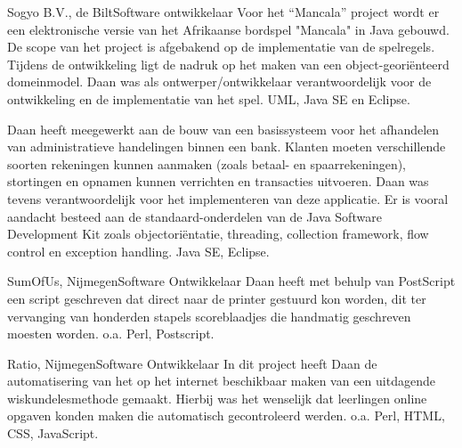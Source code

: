 \begin{workExperience}{Sogyo B.V., de Bilt}{Software ontwikkelaar}{}
		Voor het ``Mancala'' project wordt er een elektronische versie van het 
		Afrikaanse bordspel "Mancala" in Java gebouwd. De scope van het 
		project is afgebakend op de implementatie van de spelregels. Tijdens
		de ontwikkeling ligt de nadruk op het maken van een 
		object-geori\"enteerd domeinmodel. Daan was als ontwerper/ontwikkelaar
		verantwoordelijk voor de ontwikkeling en de implementatie van het 
		spel.
		\technics UML, Java SE en Eclipse.
		
		Daan heeft meegewerkt aan de bouw van een basissysteem voor het 
		afhandelen van administratieve handelingen binnen een bank. Klanten 
		moeten verschillende soorten rekeningen kunnen aanmaken (zoals betaal- 
		en spaarrekeningen), stortingen en opnamen kunnen verrichten en 
		transacties uitvoeren. Daan was tevens verantwoordelijk voor het 
		implementeren van deze applicatie. 
		Er is vooral aandacht besteed aan de standaard-onderdelen van de Java 
		Software Development Kit zoals objectori\"entatie, threading, collection 
		framework, flow control en exception handling.
		\technics Java SE, Eclipse. 
	\end{workExperience}
	
	\begin{workExperience}{SumOfUs, Nijmegen}{Software Ontwikkelaar}{}
		Daan heeft met behulp van PostScript een script geschreven dat direct 
		naar de printer gestuurd kon worden, dit ter vervanging van honderden 
		stapels scoreblaadjes die handmatig geschreven moesten worden.
		\technics o.a. Perl, Postscript.
	\end{workExperience}

	\begin{workExperience}{Ratio, Nijmegen}{Software Ontwikkelaar}{}
		In dit project heeft Daan de automatisering van het op het internet 
		beschikbaar maken van een uitdagende wiskundelesmethode gemaakt. Hierbij
		was het wenselijk dat leerlingen online opgaven konden maken die 
		automatisch gecontroleerd werden.
		\technics o.a. Perl, HTML, CSS, JavaScript.	
	\end{workExperience}
